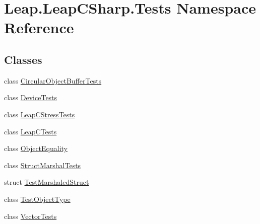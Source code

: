 \hypertarget{namespace_leap_1_1_leap_c_sharp_1_1_tests}{}\section{Leap.\+Leap\+C\+Sharp.\+Tests Namespace Reference}
\label{namespace_leap_1_1_leap_c_sharp_1_1_tests}
\subsection*{Classes}
\begin{DoxyCompactItemize}
\item 
class \mbox{\hyperlink{class_leap_1_1_leap_c_sharp_1_1_tests_1_1_circular_object_buffer_tests}{Circular\+Object\+Buffer\+Tests}}
\item 
class \mbox{\hyperlink{class_leap_1_1_leap_c_sharp_1_1_tests_1_1_device_tests}{Device\+Tests}}
\item 
class \mbox{\hyperlink{class_leap_1_1_leap_c_sharp_1_1_tests_1_1_leap_c_stress_tests}{Leap\+C\+Stress\+Tests}}
\item 
class \mbox{\hyperlink{class_leap_1_1_leap_c_sharp_1_1_tests_1_1_leap_c_tests}{Leap\+C\+Tests}}
\item 
class \mbox{\hyperlink{class_leap_1_1_leap_c_sharp_1_1_tests_1_1_object_equality}{Object\+Equality}}
\item 
class \mbox{\hyperlink{class_leap_1_1_leap_c_sharp_1_1_tests_1_1_struct_marshal_tests}{Struct\+Marshal\+Tests}}
\item 
struct \mbox{\hyperlink{struct_leap_1_1_leap_c_sharp_1_1_tests_1_1_test_marshaled_struct}{Test\+Marshaled\+Struct}}
\item 
class \mbox{\hyperlink{class_leap_1_1_leap_c_sharp_1_1_tests_1_1_test_object_type}{Test\+Object\+Type}}
\item 
class \mbox{\hyperlink{class_leap_1_1_leap_c_sharp_1_1_tests_1_1_vector_tests}{Vector\+Tests}}
\end{DoxyCompactItemize}
